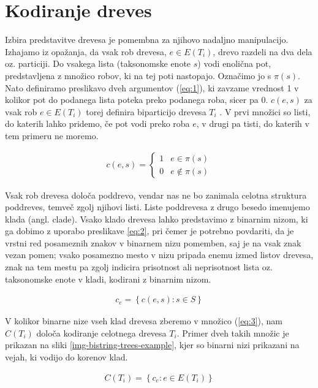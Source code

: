 \documentclass[a4paper, 12pt]{book}
\begin{document}
\section{Kodiranje dreves}
Izbira predstavitve drevesa je pomembna za njihovo nadaljno manipulacijo. Izhajamo iz opažanja, da vsak rob drevesa, $e \in E(T_i)$, drevo razdeli na dva dela oz. particiji. Do vsakega lista (taksonomske enote $s$) vodi enolična pot, predstavljena z množico robov, ki na tej poti nastopajo. Označimo jo s $\pi(s)$. Nato definiramo preslikavo dveh argumentov (\ref{eq:1}), ki zavzame vrednost 1 v kolikor pot do podanega lista poteka preko podanega roba, sicer pa 0. $c(e, s)$ za vsak rob $e \in E(T_i)$ torej definira biparticijo drevesa $T_i$ \cite{pw}. V prvi množici so listi, do katerih lahko pridemo, če pot vodi preko roba $e$, v drugi pa tisti, do katerih v tem primeru ne moremo.

\begin{align}
	c(e, s) = 
	\left\{
		\begin{array}{ll}
			1 & e \in \pi(s) \\
			0 & e \notin \pi(s)
		\end{array}
	\right.
	\label{eq:1}
\end{align}

Vsak rob drevesa določa poddrevo, vendar nas ne bo zanimala celotna struktura poddreves, temveč zgolj njihovi listi. Liste poddrevesa z drugo besedo imenujemo klada (angl. clade). Vsako klado drevesa lahko predstavimo z binarnim nizom, ki ga dobimo z uporabo preslikave \ref{eq:2}, pri čemer je potrebno povdariti, da je vrstni red posameznih znakov v binarnem nizu pomemben, saj je na vsak znak vezan pomen; vsako posamezno mesto v nizu pripada enemu izmed listov drevesa, znak na tem mestu pa zgolj indicira prisotnost ali neprisotnost lista oz. taksonomske enote v kladi, kodirani z binarnim nizom.


\begin{align}
	c_e = \left\{ c(e, s): s \in S \right\} \label{eq:2}
\end{align}

V kolikor binarne nize vseh klad drevesa zberemo v množico (\ref{eq:3}), nam $C(T_i)$ določa kodiranje celotnega drevesa $T_i$. Primer dveh takih množic je prikazan na sliki \ref{img-bistring-trees-example}, kjer so binarni nizi prikazani na vejah, ki vodijo do korenov klad.

\begin{align}
	C(T_i) = \left\{ c_e : e \in E(T_i) \right\} \label{eq:3}
\end{align}
\end{document}
